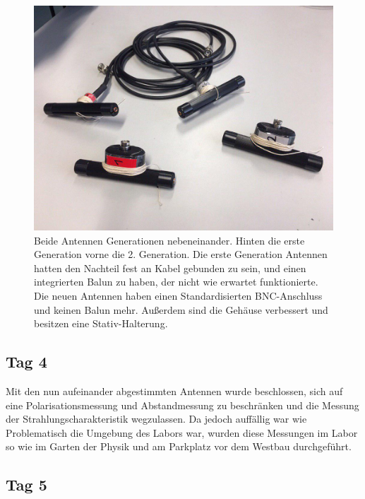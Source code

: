 \documentclass[titlepage,11pt,a4paper,ngerman]{article}
\begin{document}
\begin{figure}[ht]
	\centering
	\includegraphics[scale=0.3, trim={0cm 3cm 0cm 1cm}, clip]{Bilder/Ant_12}
	\caption{Beide Antennen Generationen nebeneinander. Hinten die erste Generation vorne die 2. Generation. Die erste Generation Antennen hatten den Nachteil fest an Kabel gebunden zu sein, und einen integrierten Balun zu haben, der nicht wie erwartet funktionierte. Die neuen Antennen haben einen Standardisierten BNC-Anschluss und keinen Balun mehr. Außerdem sind die Gehäuse verbessert und besitzen eine Stativ-Halterung.}
	\label{Antennen1u2}
\end{figure}

\subsection{Tag 4}

Mit den nun aufeinander abgestimmten Antennen wurde beschlossen, sich auf eine  Polarisationsmessung und Abstandmessung zu beschränken und die Messung der Strahlungscharakteristik wegzulassen. Da jedoch auffällig war wie Problematisch die Umgebung des Labors war, wurden diese Messungen im Labor so wie im Garten der Physik und am Parkplatz vor dem Westbau durchgeführt.

\subsection{Tag 5}
\end{document}
